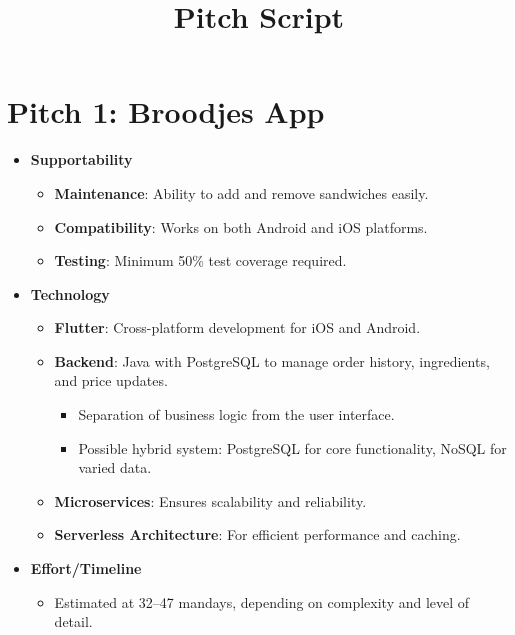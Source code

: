 \documentclass{article}
\begin{document}
\title{Pitch Script}
\author{}
\date{}
\maketitle

\section*{Pitch 1: Broodjes App}

\begin{itemize}
    \item \textbf{Supportability}
    \begin{itemize}
        \item \textbf{Maintenance}: Ability to add and remove sandwiches easily.
        \item \textbf{Compatibility}: Works on both Android and iOS platforms.
        \item \textbf{Testing}: Minimum 50\% test coverage required.
    \end{itemize}

    \item \textbf{Technology}
    \begin{itemize}
        \item \textbf{Flutter}: Cross-platform development for iOS and Android.
        \item \textbf{Backend}: Java with PostgreSQL to manage order history, ingredients, and price updates.
        \begin{itemize}
            \item Separation of business logic from the user interface.
            \item Possible hybrid system: PostgreSQL for core functionality, NoSQL for varied data.
        \end{itemize}
        \item \textbf{Microservices}: Ensures scalability and reliability.
        \item \textbf{Serverless Architecture}: For efficient performance and caching.
    \end{itemize}

    \item \textbf{Effort/Timeline}
    \begin{itemize}
        \item Estimated at 32–47 mandays, depending on complexity and level of detail.
    \end{itemize}
\end{itemize}
\end{document}
